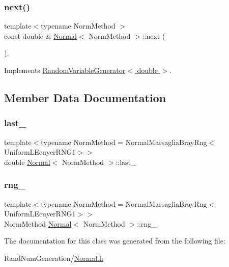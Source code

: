 \subsubsection{\texorpdfstring{next()}{next()}}
{\footnotesize\ttfamily template$<$typename Norm\+Method $>$ \\
const double \& \hyperlink{class_normal}{Normal}$<$ Norm\+Method $>$\+::next (\begin{DoxyParamCaption}{ }\end{DoxyParamCaption})\hspace{0.3cm}{\ttfamily [override]}, {\ttfamily [virtual]}}



Implements \hyperlink{class_random_variable_generator_a5178e1f85eff432dffd6320767136836}{Random\+Variable\+Generator$<$ double $>$}.



\subsection{Member Data Documentation}
\hypertarget{class_normal_a69f8977c8b8224cf6345b1e2d0d35382}{}\label{class_normal_a69f8977c8b8224cf6345b1e2d0d35382} 
\subsubsection{\texorpdfstring{last\+\_\+}{last\_}}
{\footnotesize\ttfamily template$<$typename Norm\+Method  = Normal\+Marsaglia\+Bray\+Rng$<$\+Uniform\+L\+Ecuyer\+R\+N\+G1$>$$>$ \\
double \hyperlink{class_normal}{Normal}$<$ Norm\+Method $>$\+::last\+\_\+\hspace{0.3cm}{\ttfamily [private]}}

\hypertarget{class_normal_a84d6a0d0b702c4cc19d66f960040276c}{}\label{class_normal_a84d6a0d0b702c4cc19d66f960040276c} 
\subsubsection{\texorpdfstring{rng\+\_\+}{rng\_}}
{\footnotesize\ttfamily template$<$typename Norm\+Method  = Normal\+Marsaglia\+Bray\+Rng$<$\+Uniform\+L\+Ecuyer\+R\+N\+G1$>$$>$ \\
Norm\+Method \hyperlink{class_normal}{Normal}$<$ Norm\+Method $>$\+::rng\+\_\+\hspace{0.3cm}{\ttfamily [private]}}



The documentation for this class was generated from the following file\+:\begin{DoxyCompactItemize}
\item 
Rand\+Num\+Generation/\hyperlink{_normal_8h}{Normal.\+h}\end{DoxyCompactItemize}
